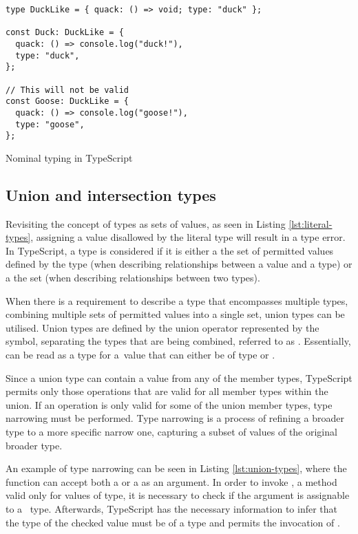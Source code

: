 \begin{listing}[ht]
  \begin{verbatim}
type DuckLike = { quack: () => void; type: "duck" };

const Duck: DuckLike = {
  quack: () => console.log("duck!"),
  type: "duck",
};

// This will not be valid
const Goose: DuckLike = {
  quack: () => console.log("goose!"),
  type: "goose",
};
\end{verbatim}
  \caption{Nominal typing in TypeScript}\label{lst:nominal-types-emulation}
\end{listing}

\subsection{Union and intersection types}\label{sec:union-intersection}

Revisiting the concept of types as sets of values, as seen in Listing \ref{lst:literal-types}, assigning a value disallowed by the literal type will result in a type error. In TypeScript, a type is considered  if it is either a  the set of permitted values defined by the type (when describing relationships between a value and a type) or a  the set (when describing relationships between two types).

When there is a requirement to describe a type that encompasses multiple types, combining multiple sets of permitted values into a single set, union types can be utilised. Union types are defined by the union operator represented by the \code{|} symbol, separating the types that are being combined, referred to as  \cite{DocumentationEverydayTypes}. Essentially,  can be read as a type for a~value that can either be of type  or .

Since a union type can contain a value from any of the member types, TypeScript permits only those operations that are valid for all member types within the union. If an operation is only valid for some of the union member types, type narrowing must be performed. Type narrowing is a process of refining a broader type to a more specific narrow one, capturing a subset of values of the original broader type.

An example of type narrowing can be seen in Listing \ref{lst:union-types}, where the function  can accept both a  or a  as an argument. In order to invoke , a method valid only for values of  type, it is necessary to check if the argument is assignable to a~ type. Afterwards, TypeScript has the necessary information to infer that the type of the checked value must be of a  type and permits the invocation of .

